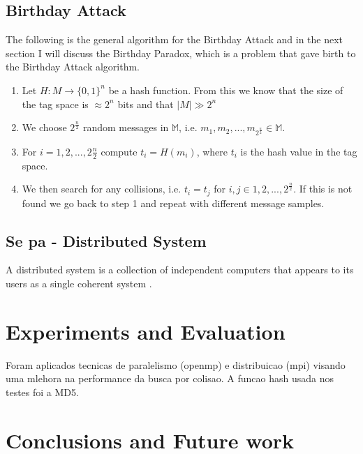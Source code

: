 \documentclass[12pt]{article}
\begin{document}
\subsection{Birthday Attack}

The following is the general algorithm for the Birthday Attack and in the next section I will discuss
the Birthday Paradox, which is a problem that gave birth to the Birthday Attack algorithm.
\begin{enumerate}
\item Let \(H : M \to \{0,1\}^n\) be a hash function. From this we know that the size of the tag space is \(\approx 2^n\) bits
and that \(| M | \gg 2^n\)
\item We choose \(2^\frac{n}{2}\) random messages in \(\mathbb{M}\), i.e. \(m_1, m_2, ... , m_{2^\frac{n}{2}} \in \mathbb{M}\).
\item For \(i = 1,2, ... , 2\frac{n}{2}\) compute \(t_i = H(m_i)\), where \(t_i\) is the hash value in the tag space.
\item We then search for any collisions, i.e. \(t_i = t_j\) for \(i, j \in {1, 2, ... , 2^\frac{n}{2}}\). If this is not
found we go back to step 1 and repeat with different message samples.
\end{enumerate}

\subsection{Se pa - Distributed System}
A distributed system is a collection of independent computers that appears to its users as a single 
coherent system \cite{tanenbaum2002distributed}.
 
\section{Experiments and Evaluation}

Foram aplicados tecnicas de paralelismo (openmp) e distribuicao (mpi) visando uma mlehora na performance
da busca por colisao. A funcao hash usada nos testes foi a MD5.

\section{Conclusions and Future work}



\end{document}
